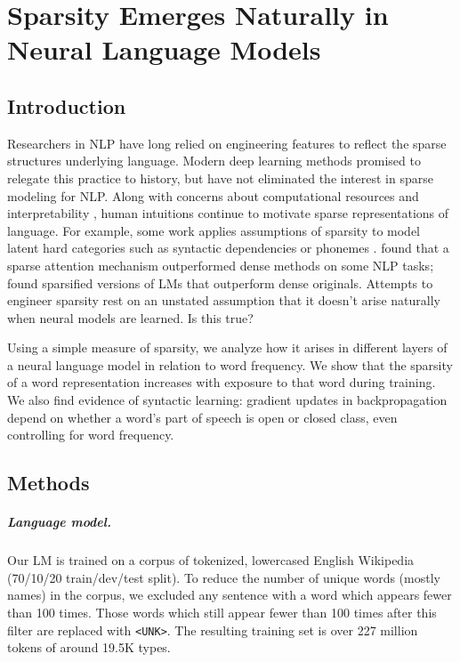 \chapter{Sparsity Emerges Naturally in Neural Language Models}\label{chapter:sparsity}

\section{Introduction}


Researchers in  NLP have long relied on engineering features to reflect the sparse  structures underlying language. Modern deep learning methods promised to  relegate this practice to history, but have not eliminated the interest in sparse modeling for NLP. Along with concerns about  computational resources \cite{chen2016compressing,narang2017exploring} and interpretability \cite{murphy2012learning,subramanian2018spine}, human intuitions continue to motivate sparse representations of language.  For example, some work   applies assumptions of sparsity to model latent hard categories such as syntactic dependencies \cite{pado2007dependency} or phonemes \cite{cotterell2018deep}. \citeauthor{niculae2017regularized} found that a sparse attention mechanism outperformed dense methods on some NLP tasks; \citeauthor{narang_exploring_2017} found sparsified versions of LMs that outperform dense originals. Attempts to engineer sparsity rest on an unstated assumption that it doesn’t arise naturally when neural models are learned. Is this true? %

Using a simple measure of sparsity, we analyze how it arises in different layers of a neural language model in relation to word frequency. We show that the sparsity of a word representation increases with exposure to that word during training.  We also find evidence of syntactic learning: gradient updates in backpropagation depend on whether a word's part of speech is open or closed class, even controlling for word frequency.

\section{Methods}

\paragraph{Language model.} Our LM is trained on a corpus of tokenized, lowercased English Wikipedia (70/10/20 train/dev/test split).  To reduce the  number of unique words (mostly names) in the corpus, we excluded any sentence with a word which appears fewer than 100 times. Those words which still appear fewer than 100 times after this filter are replaced with \verb=<UNK>=. The resulting training set is over 227 million tokens of around 19.5K types.
% 


